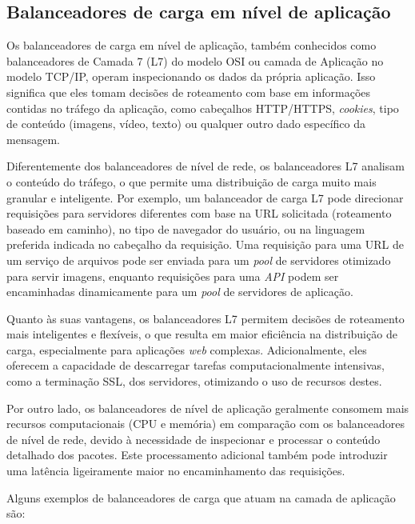 \subsection{Balanceadores de carga em nível de aplicação}

Os balanceadores de carga em nível de aplicação, também conhecidos como balanceadores de Camada 7 (L7) do modelo OSI ou camada de Aplicação no modelo TCP/IP, operam inspecionando os dados da própria aplicação. Isso significa que eles tomam decisões de roteamento com base em informações contidas no tráfego da aplicação, como cabeçalhos HTTP/HTTPS, \textit{cookies}, tipo de conteúdo (imagens, vídeo, texto) ou qualquer outro dado específico da mensagem.

Diferentemente dos balanceadores de nível de rede, os balanceadores L7 analisam o conteúdo do tráfego, o que permite uma distribuição de carga muito mais granular e inteligente. Por exemplo, um balanceador de carga L7 pode direcionar requisições para servidores diferentes com base na URL solicitada (roteamento baseado em caminho), no tipo de navegador do usuário, ou na linguagem preferida indicada no cabeçalho da requisição. Uma requisição para uma URL de um serviço de arquivos pode ser enviada para um \textit{pool} de servidores otimizado para servir imagens, enquanto requisições para uma \textit{API} podem ser encaminhadas dinamicamente para um \textit{pool} de servidores de aplicação.

Quanto às suas vantagens, os balanceadores L7 permitem decisões de roteamento mais inteligentes e flexíveis, o que resulta em maior eficiência na distribuição de carga, especialmente para aplicações \textit{web} complexas. Adicionalmente, eles oferecem a capacidade de descarregar tarefas computacionalmente intensivas, como a terminação SSL, dos servidores, otimizando o uso de recursos destes.

Por outro lado, os balanceadores de nível de aplicação geralmente consomem mais recursos computacionais (CPU e memória) em comparação com os balanceadores de nível de rede, devido à necessidade de inspecionar e processar o conteúdo detalhado dos pacotes. Este processamento adicional também pode introduzir uma latência ligeiramente maior no encaminhamento das requisições.

Alguns exemplos de balanceadores de carga que atuam na camada de aplicação são:

